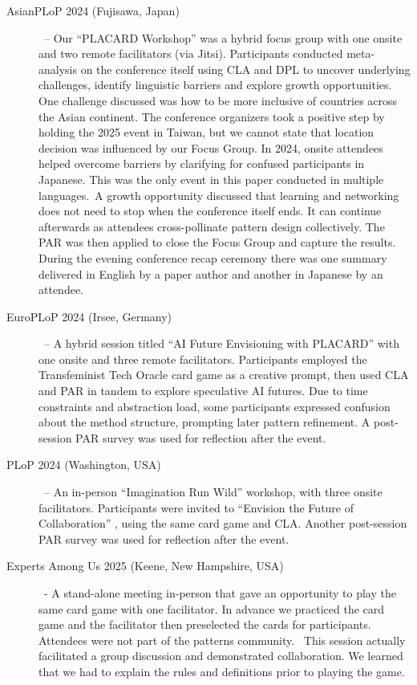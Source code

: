\documentclass[acmlarge,timestamp]{acmart}
\begin{document}
\begin{description}
\item[AsianPLoP 2024 (Fujisawa, Japan)]{~-- Our “PLACARD Workshop”
  \cite{Danoff2024} was a hybrid focus group with one onsite and two
  remote facilitators (via Jitsi). Participants conducted
  meta-analysis on the conference itself using CLA and DPL to uncover
  underlying challenges, identify linguistic barriers and explore
  growth opportunities. One challenge discussed was how to be more
  inclusive of countries across the Asian continent. The conference
  organizers took a positive step by holding the 2025 event in Taiwan,
  but we cannot state that location decision was influenced by our
  Focus Group. In 2024, onsite attendees helped overcome barriers by clarifying
  for confused participants in Japanese. This was the only event in
  this paper conducted in multiple languages.}{~A growth opportunity
  discussed that learning and networking does not need to stop when
  the conference itself ends. It can continue afterwards as attendees
  cross-pollinate pattern design collectively. The PAR was then
  applied to close the Focus Group and capture the results. During the
  evening conference recap ceremony there was one summary delivered in
  English by a paper author and another in Japanese by an attendee.}
\item[EuroPLoP 2024 (Irsee, Germany)]{~-- A hybrid session titled “AI
  Future Envisioning with PLACARD” \cite{Tedeschi2024} with one
  onsite and three remote facilitators. Participants employed the
  Transfeminist Tech Oracle card game as a creative prompt, then used
  CLA and PAR in tandem to explore speculative AI futures. Due to time
  constraints and abstraction load, some participants expressed
  confusion about the method structure, prompting later pattern
  refinement. A post-session PAR survey was used for reflection after
  the event.}
\item[PLoP 2024 (Washington, USA)]{~-- An in-person “Imagination Run
  Wild” workshop, with three onsite facilitators. Participants were
  invited to “Envision the Future of Collaboration” \cite{ayloo2024},
  using the same card game and CLA.  Another post-session PAR survey
  was used for reflection after the event.}
\item[Experts Among Us 2025 (Keene, New Hampshire, USA)]{~- A stand-alone
  meeting in-person that gave an opportunity to play the same card game
  with one facilitator. In advance we practiced the card game and the
  facilitator then preselected the cards for participants. Attendees
  were not part of the patterns community. ~This session actually
  facilitated a group discussion and demonstrated collaboration. We
  learned that we had to explain the rules and definitions prior to
  playing the game.}
\end{description}
\end{document}
